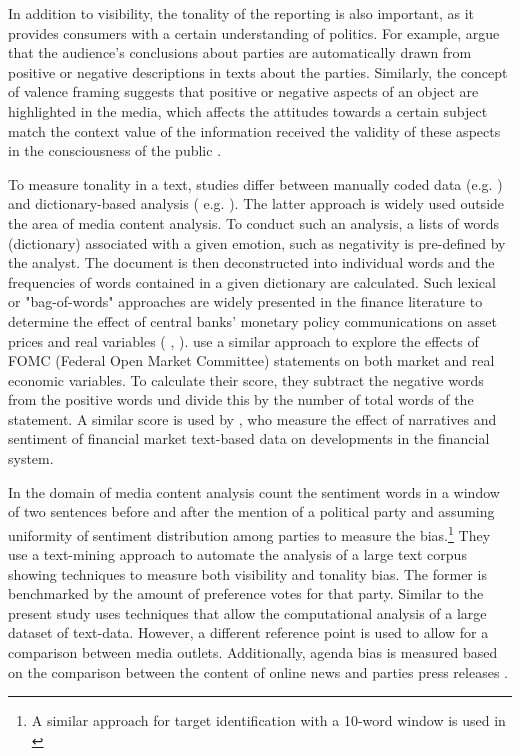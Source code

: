 \documentclass[12pt,a4paper,notitlepage]{article}
\begin{document}
In addition to visibility, the tonality of the reporting is also important, as it provides consumers with a certain understanding of politics. For example, \citet{druckman_impact_2005} argue that the audience's conclusions about parties are automatically drawn from positive or negative descriptions in texts about the parties. Similarly, the concept of valence framing suggests that positive or negative aspects of an object are highlighted in the media, which affects the attitudes towards a certain subject match the context value of the information received the validity of these aspects in the consciousness of the public \citep{de_vreese_valenced_2006, hurtikova_importance_2017}. 

To measure tonality in a text, studies differ between manually coded data (e.g. \citet{eberl_one_2017}) and dictionary-based analysis ( e.g. \citep{junque_de_fortuny_media_2012}). The latter approach is widely used outside the area of media content analysis. To conduct such an analysis, a lists of words (dictionary) associated with a given emotion, such as negativity is pre-defined by the analyst. The document is then deconstructed into individual words and the frequencies of words contained in a given dictionary are calculated. Such lexical or "bag-of-words" approaches are widely presented in the finance literature to determine the effect of central banks' monetary policy communications on asset prices and real variables (\citet{nyman_news_2018} \citet{tetlock_giving_2007}, \citet{tetlock_more_2008}). \citet{hansen_shocking_2016} use a similar approach to explore the effects of FOMC (Federal Open Market Committee) statements on both market and real economic variables. To calculate their score, they subtract the negative words from the positive words und divide this by the number of total words of the statement. A similar score is used by \citet{nyman_news_2018}, who measure the effect of narratives and sentiment of financial market text-based data on developments in the financial system. 

In the domain of media content analysis \citet{junque_de_fortuny_media_2012} count the sentiment words in a window of two sentences before and after the mention of a political party and assuming uniformity of sentiment distribution among parties to measure the bias.\footnote{A similar approach for target identification with a 10-word window is used in \citet{balahur_sentiment_2013}} They use a text-mining approach to automate the analysis of a large text corpus showing techniques to measure both visibility and tonality bias. The former is benchmarked by the amount of preference votes for that party. Similar to \citet{junque_de_fortuny_media_2012} the present study uses techniques that allow the computational analysis of a large dataset of text-data. However, a different reference point is used to allow for a comparison between media outlets. Additionally, agenda bias is measured based on the comparison between the content of online news and parties press releases \citet{eberl_one_2017}.  
\end{document}
